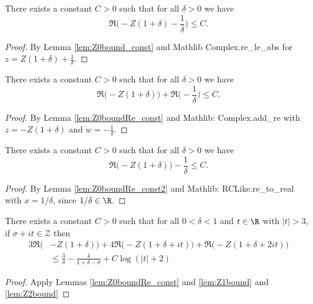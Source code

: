 \begin{lemma} \label{lem:Z0boundRe_const}  \leanok
There exists a constant $C>0$ such that for all $\delta>0$ we have
\[ \Re\Big(-Z(1+\delta) - \frac{1}{\delta}\Big) \le C. \]
\end{lemma}
\begin{proof}
\leanok
By Lemma \ref{lem:Z0bound_const} and Mathlib Complex.re\_le\_abs for $z=Z(1+\delta) + \frac{1}{\delta}$.
\end{proof}

\begin{lemma} \label{lem:Z0boundRe_const2}  \leanok
There exists a constant $C>0$ such that for all $\delta>0$ we have
\[ \Re\big(-Z(1+\delta)\big) + \Re\big(- \frac{1}{\delta}\big) \le C. \]
\end{lemma}
\begin{proof}
\leanok
By Lemma \ref{lem:Z0boundRe_const} and Mathlib: Complex.add\_re with $z=-Z(1+\delta)$ and $w=- \frac{1}{\delta}$.
\end{proof}

\begin{lemma} \label{lem:Z0boundRe_const3}  \leanok
There exists a constant $C>0$ such that for all $\delta>0$ we have
\[ \Re\big(-Z(1+\delta)\big) - \frac{1}{\delta} \le C. \]
\end{lemma}
\begin{proof}
\leanok
By Lemma \ref{lem:Z0boundRe_const2} and Mathlib: RCLike.re\_to\_real with $x=1/\delta$, since $1/\delta\in\R$.
\end{proof}

\begin{lemma} \label{lem:Z341bounds_const}  \leanok
There exists a constant $C>0$ such that for all $0<\delta<1$ and $t\in\R$ with $|t|>3$, if
$\sigma +it\in \mathcal{Z}$ then
\begin{align*}
3\Re\big(&-Z(1+\delta)\big) + 4\Re\big(-Z(1+\delta+it)\big) + \Re\big(-Z(1+\delta+2it)\big) \\
&\le \frac{3}{\delta} - \frac{4}{1+\delta-\sigma} + C\log(|t|+2)
\end{align*}
\end{lemma}
\begin{proof}
\leanok
Apply Lemmas \ref{lem:Z0boundRe_const} and \ref{lem:Z1bound} and \ref{lem:Z2bound}
\end{proof}


